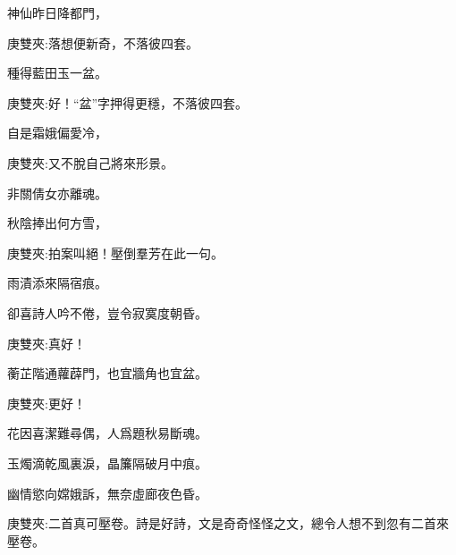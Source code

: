 \begin{poem}
    \begin{pl}神仙昨日降都門，\end{pl}
    \begin{note}庚雙夾:落想便新奇，不落彼四套。\end{note}
    \begin{pl}種得藍田玉一盆。\end{pl}
    \begin{note}庚雙夾:好！“盆”字押得更穩，不落彼四套。\end{note}

    \begin{pl}自是霜娥偏愛冷，\end{pl}
    \begin{note}庚雙夾:又不脫自己將來形景。\end{note}
    \begin{pl} 非關倩女亦離魂。\end{pl}

    \begin{pl}秋陰捧出何方雪，\end{pl}
    \begin{note}庚雙夾:拍案叫絕！壓倒羣芳在此一句。\end{note}
    \begin{pl}雨漬添來隔宿痕。\end{pl}

    \begin{pl}卻喜詩人吟不倦，豈令寂寞度朝昏。\end{pl}
    \begin{note}庚雙夾:真好！\end{note}
    \emptypl

    \begin{pl}蘅芷階通蘿薜門，也宜牆角也宜盆。\end{pl}
    \begin{note}庚雙夾:更好！\end{note}

    \begin{pl}花因喜潔難尋偶，人爲題秋易斷魂。\end{pl}

    \begin{pl}玉燭滴乾風裏淚，晶簾隔破月中痕。\end{pl}

    \begin{pl}幽情慾向嫦娥訴，無奈虛廊夜色昏。\end{pl}
    \begin{note}庚雙夾:二首真可壓卷。詩是好詩，文是奇奇怪怪之文，總令人想不到忽有二首來壓卷。\end{note}
\end{poem}


